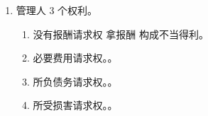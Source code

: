 \begin{enumerate}
\begin{enumerate}
\begin{enumerate}
\begin{enumerate}
                                \begin{itemize}
                                  \item {}。
                                  \item {}。
                                \end{itemize}
                          \item {}。
                                \begin{itemize}
                                  \item 他人不能狭义理解为自然人。。
                                  \item 行为。不看结果，希望大家互帮互助。
                                \end{itemize}
                          \item {}。否则构成不当无因管理（本质是侵权行为）。
                                \begin{itemize}
                                  \item {}。
                                  \item {}。
                                \end{itemize}
                          \item {}。。
                          \item vs 好意施惠。。
                          \item vs 误信管理。纯粹为自己。。
                        \end{enumerate}
                  \item 管理人 3 个权利。
                        \begin{enumerate}
                          \item 没有报酬请求权 \yjt 拿报酬 \yjt 构成不当得利。
                          \item 必要费用请求权。。
                          \item 所负债务请求权。。
                          \item 所受损害请求权。。

\end{enumerate}
\end{enumerate}
\end{enumerate}
\end{enumerate}
